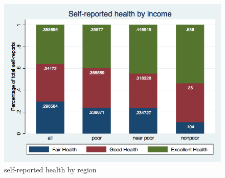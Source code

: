 \documentclass[12pt]{article}
\begin{document}
\begin{figure}[ht!]
\centering
\includegraphics[scale=0.5]{health_status_by_income.png}
\caption{self-reported health by region}
\label{fig:health_status_by_region}
\end{figure}
\end{document}
